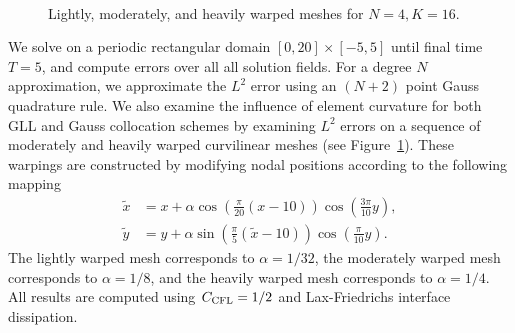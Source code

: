 \documentclass[review,onefignum,onetabnum,final]{siamart171218}
\renewcommand{\tilde}{\widetilde}
\newcommand{\LRp}[1]{\left( #1 \right)}
\begin{document}
\begin{figure}
\centering
{}
\hspace{1em}
\\
\caption{Lightly, moderately, and heavily warped meshes for $N=4, K= 16$.  }
\label{fig:warp2d}
\end{figure}

We solve on a periodic rectangular domain $[0, 20] \times [-5,5]$ until final time $T=5$, and compute errors over all all solution fields.  For a degree $N$ approximation, we approximate the $L^2$ error using an $(N+2)$ point Gauss quadrature rule.  We also examine the influence of element curvature for both GLL and Gauss collocation schemes by examining $L^2$ errors on a sequence of moderately and heavily warped curvilinear meshes (see Figure~\ref{fig:warp2d}).  These warpings are constructed by modifying nodal positions according to the following mapping
\begin{align*}
\tilde{x} &= x + \alpha\cos\LRp{\frac{\pi}{20}(x-10)}\cos\LRp{\frac{3\pi}{10}y}, \\
\tilde{y} &= y + \alpha\sin\LRp{\frac{\pi}{5}(\tilde{x}-10)}\cos\LRp{\frac{\pi}{10}y}.
\end{align*}
The lightly warped mesh corresponds to $\alpha = 1/32$, the moderately warped mesh corresponds to $\alpha = 1/8$, and the heavily warped mesh corresponds to $\alpha = 1/4$.  All results are computed using $C_{\rm CFL} = 1/2$ and Lax-Friedrichs interface dissipation.  
\end{document}
